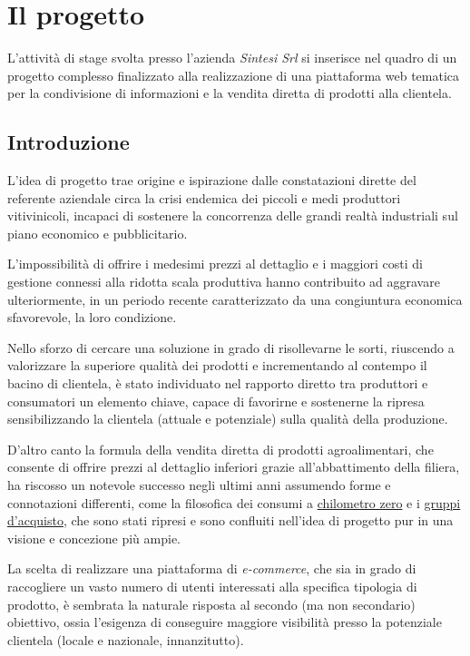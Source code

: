 \documentclass[12pt,a4paper,headsepline,hidelinks]{scrreprt} %
\def \azienda{\textit{Sintesi Srl}}
\begin{document}
	\chapter{Il progetto}
	L'attività di stage svolta presso l'azienda \azienda{} si inserisce nel quadro di un progetto complesso finalizzato alla realizzazione di una piattaforma web tematica per la condivisione di informazioni e la vendita diretta di prodotti alla clientela.

	\section{Introduzione}
	L'idea di progetto trae origine e ispirazione dalle constatazioni dirette del referente aziendale circa la crisi endemica dei piccoli e medi produttori vitivinicoli, incapaci di sostenere la concorrenza delle grandi realtà industriali sul piano economico e pubblicitario.

	L'impossibilità di offrire i medesimi prezzi al dettaglio e i maggiori costi di gestione connessi alla ridotta scala produttiva hanno contribuito ad aggravare ulteriormente, in un periodo recente caratterizzato da una congiuntura economica sfavorevole, la loro condizione.

	Nello sforzo di cercare una soluzione in grado di risollevarne le sorti, riuscendo a valorizzare la superiore qualità dei prodotti e incrementando al contempo il bacino di clientela, è stato individuato nel rapporto diretto tra produttori e consumatori un elemento chiave, capace di favorirne e sostenerne la ripresa sensibilizzando la clientela (attuale e potenziale) sulla qualità della produzione.

	D'altro canto la formula della vendita diretta di prodotti agroalimentari, che consente di offrire prezzi al dettaglio inferiori grazie all'abbattimento della filiera, ha riscosso un notevole successo negli ultimi anni assumendo forme e connotazioni differenti, come la filosofica dei consumi a \underline{chilometro zero} e i \underline{gruppi d'acquisto}, che sono stati ripresi e sono confluiti nell'idea di progetto pur in una visione e concezione più ampie.

	La scelta di realizzare una piattaforma di \textit{e-commerce}, che sia in grado di raccogliere un vasto numero di utenti interessati alla specifica tipologia di prodotto, è sembrata la naturale risposta al secondo (ma non secondario) obiettivo, ossia l'esigenza di conseguire maggiore visibilità presso la potenziale clientela (locale e nazionale, innanzitutto).
\end{document}
